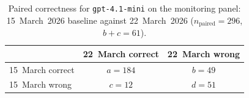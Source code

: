 \begin{table}[htbp]
    \centering
    \caption{Paired correctness for \texttt{gpt-4.1-mini} on the monitoring panel:
    15~March~2026 baseline against 22~March~2026
    ($n_{\mathrm{paired}}=296$, $b+c=61$).}
    \label{tab:contingency-trigger}
    \begin{tabular}{lcc}
    \toprule
     & 22~March correct & 22~March wrong \\
    \midrule
    15~March correct & $a=184$ & $b=49$ \\
    15~March wrong   & $c=12$ & $d=51$ \\
    \bottomrule
    \end{tabular}
\end{table}
